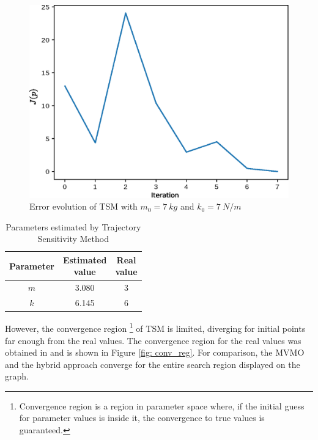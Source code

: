 \begin{figure}[h]
	\caption{Error evolution of TSM with $m_{0} = 7\ kg$ and $k_{0} = 7\ N/m$}
	\begin{center}
		\includegraphics[scale=0.6]{Images/TS_conv.eps}
	\end{center}
	\label{fig: TS_conv}
\end{figure}

\begin{table}[h]
	\caption{Parameters estimated by Trajectory Sensitivity Method}
	\begin{center}
		\begin{tabular}{c|c|c}
			Parameter & \shortstack{Estimated \\ value} & \shortstack{Real \\ value} \\
			\hline
			$m$ & 3.080 & 3 \\
			$k$ & 6.145 & 6 \\
		\end{tabular}
	\end{center}
	\label{tab: spring_mass_ts}
\end{table}

However, the convergence region \footnote{Convergence region is a region in parameter space where, if the initial guess for parameter values is inside it, the convergence to true values is guaranteed.} of TSM is limited, diverging for initial points far enough from the real values. The convergence region for the real values was obtained in \cite{Ecyo} and is shown in Figure \ref{fig: conv_reg}. For comparison, the MVMO and the hybrid approach converge for the entire search region displayed on the graph.

